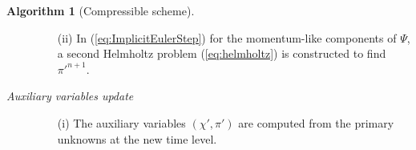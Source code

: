 \documentclass{ametsoc}
\theoremstyle{definition}
\newtheorem{algorithm}{Algorithm}
\newcommand{\eq}[1]{(\ref{#1})}
\newcommand{\piprime}{\pi'}
\newenvironment{falgorithm}
  {\begin{mdframed}\begin{algorithm}}
  {\end{algorithm}\end{mdframed}}
\begin{document}
\begin{falgorithm}[Compressible scheme]
\begin{description}
\begin{enumerate}
    \item[(ii)] In \eq{eq:ImplicitEulerStep} for the momentum-like components of $\Psi$, a second Helmholtz problem \eq{eq:helmholtz} is constructed to find $\pi'^{n+1}$.

  \end{enumerate}

\item[\emph{Auxiliary variables update}]

  \begin{enumerate}\item[]
    \item[(i)] The auxiliary variables $(\chi', \piprime)$ are computed from the primary unknowns at the new time level.
  \end{enumerate}

%
%
\end{description}
\end{falgorithm}






%
%
\end{document}
